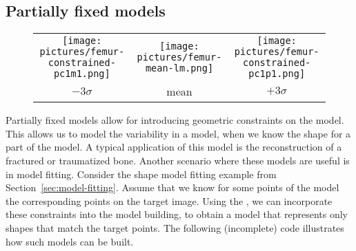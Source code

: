 \documentclass{InsightArticle}
\begin{document}
\subsection{Partially fixed models}
\begin{figure}[tbh]
  \begin{tabular}{ccc}
    \texttt{[image: pictures/femur-constrained-pc1m1.png]}&
    \texttt{[image: pictures/femur-mean-lm.png]}& 
    \texttt{[image: pictures/femur-constrained-pc1p1.png]}
    \\
    $-3 \sigma$ & mean & $+3 \sigma$
  \end{tabular}
    \label{fig:constrained-model}
\end{figure}
Partially fixed models allow for introducing geometric constraints on
the model. This allows us to model the variability in a model, when we know the shape for a part of the model.
A typical application of this model is the reconstruction of a fractured or traumatized bone. 
Another scenario where these models are useful is in model fitting. 
Consider the shape model fitting example from Section~\ref{sec:model-fitting}. Assume
that we know for some points of the model the corresponding points on the target image. 
Using the , we can
incorporate these constraints into the model building, to obtain a
model that represents only shapes that match the target points.  The
following (incomplete) code illustrates how such models can be built.
\end{document}
